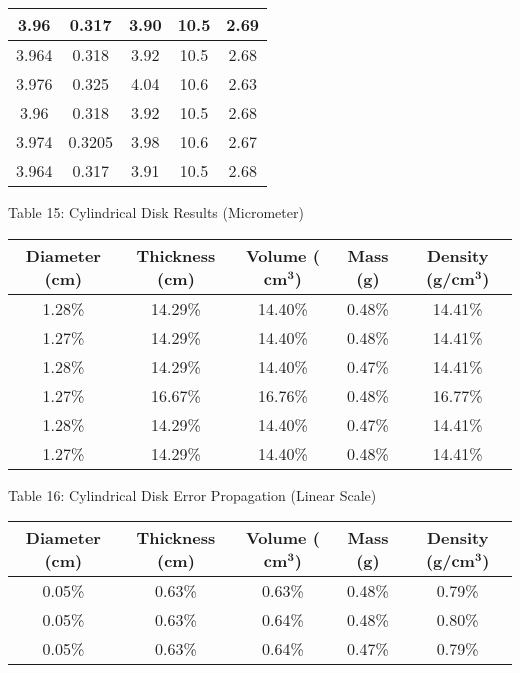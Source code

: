 \begin{center}
\begin{center}
\begin{tabular}{|c|c|c|c|c|}
        \hline
        3.96 & 0.317 & 3.90 & 10.5 & 2.69 \\ \hline
        3.964 & 0.318 & 3.92 & 10.5 & 2.68 \\ \hline
        3.976 & 0.325 & 4.04 & 10.6 & 2.63 \\ \hline
        3.96 & 0.318 & 3.92 & 10.5 & 2.68 \\ \hline
        3.974 & 0.3205 & 3.98 & 10.6 & 2.67 \\ \hline
        3.964 & 0.317 & 3.91 & 10.5 & 2.68 \\ \hline
    \end{tabular}
\end{center}
Table 15: Cylindrical Disk Results (Micrometer)
\begin{center}
    \begin{tabular}{|c|c|c|c|c|}
        \hline
        \textbf{Diameter (cm)} & \textbf{Thickness (cm)} & \textbf{Volume ($\bm{\textbf{cm}^3}$)} & \textbf{Mass (g)} & \textbf{Density (g/$\bm{\textbf{cm}^3}$)}  \\
        \hline
        1.28\% & 14.29\% & 14.40\% & 0.48\% & 14.41\% \\ \hline
        1.27\% & 14.29\% & 14.40\% & 0.48\% & 14.41\% \\ \hline
        1.28\% & 14.29\% & 14.40\% & 0.47\% & 14.41\% \\ \hline
        1.27\% & 16.67\% & 16.76\% & 0.48\% & 16.77\% \\ \hline
        1.28\% & 14.29\% & 14.40\% & 0.47\% & 14.41\% \\ \hline
        1.27\% & 14.29\% & 14.40\% & 0.48\% & 14.41\% \\ \hline
    \end{tabular}
\end{center}
\vspace{3 mm}
Table 16: Cylindrical Disk Error Propagation (Linear Scale)
\begin{center}
    \begin{tabular}{|c|c|c|c|c|}
        \hline
        \textbf{Diameter (cm)} & \textbf{Thickness (cm)} & \textbf{Volume ($\bm{\textbf{cm}^3}$)} & \textbf{Mass (g)} & \textbf{Density (g/$\bm{\textbf{cm}^3}$)}  \\
        \hline
        0.05\% & 0.63\% & 0.63\% & 0.48\% & 0.79\% \\ \hline
        0.05\% & 0.63\% & 0.64\% & 0.48\% & 0.80\% \\ \hline
        0.05\% & 0.63\% & 0.64\% & 0.47\% & 0.79\% \\ \hline

\end{tabular}
\end{center}
\end{center}
